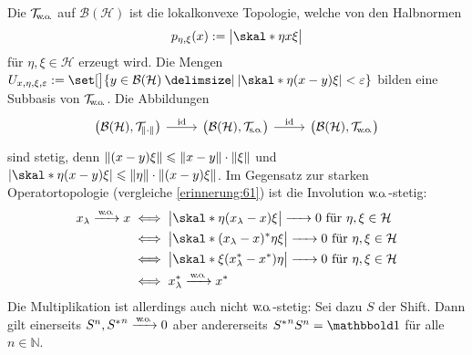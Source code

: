 \begin{erinnerungA}[{name=[schwache Operatortopologie]},label=erinnerung:616]
	Die  $\TWeakOp$ auf $\mathcal{B}(\mathcal{H})$ ist die lokalkonvexe Topologie, welche von den Halbnormen
	\[
		p_{\eta,\xi}(x) := \abs[\big]{\skal*{\eta}{x \xi}} 
	\]
	für $\eta,\xi \in \mathcal{H}$ erzeugt wird.
	Die Mengen $U_{x,\eta,\xi,\varepsilon} := \set[\big]{y \in \mathcal{B}(\mathcal{H}) \given \abs*{\skal*{\eta}{(x-y)\xi}} < \varepsilon}$ bilden eine Subbasis von $\TWeakOp$.
	Die Abbildungen
	\[
		\begin{tikzcd}
			\enbrace[\big]{\mathcal{B}(\mathcal{H}),\Top{\norm*{\cdot}}} \rar["\id"] & \enbrace[\big]{\mathcal{B}(\mathcal{H}),\Top{\so}} \rar["\id"] & \enbrace[\big]{\mathcal{B}(\mathcal{H}), \TWeakOp}
		\end{tikzcd}
	\]
	sind stetig, denn $\norm*{(x-y)\xi} \le \norm*{x-y} \cdot \norm*{\xi}$ und $\abs*{ \skal*{\eta}{(x-y)\xi}} \le \norm*{\eta} \cdot \norm*{(x-y) \xi}$.
	Im Gegensatz zur starken Operatortopologie (vergleiche \autoref{erinnerung:61}) ist die Involution $\wo$-stetig:
	\begin{align}
		x_\lambda \grenzw{\wo} x &\iff \abs[\big]{\skal*{\eta}{(x_\lambda-x)\xi}} \grenzw{} 0 \text{ für } \eta,\xi \in \mathcal{H} \\
		&\iff \abs[\big]{\skal*{(x_\lambda-x)^* \eta}{\xi}}   \grenzw{} 0 \text{ für } \eta,\xi \in \mathcal{H} \\
		&\iff \abs[\big]{\skal*{\xi}{(x_\lambda^* -x^*) \eta}} \grenzw{} 0 \text{ für } \eta,\xi \in \mathcal{H} \\
		&\iff x_\lambda^* \grenzw{\wo} x^* 
	\end{align}
	Die Multiplikation ist allerdings auch nicht $\wo$-stetig: Sei dazu $S$ der Shift. Dann gilt einerseits $S^n,{S^*}^n \grenzw{\wo} 0$ aber andererseits ${S^*}^n S^n=\ind$ für alle $n \in \mathbb{N}$.
\end{erinnerungA}

